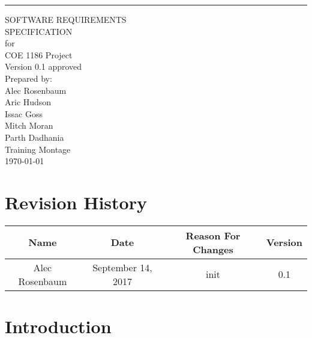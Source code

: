 \documentclass{scrreprt}
\date{}
\def\myversion{0.1 }
\begin{document}
\begin{flushright}
    \rule{16cm}{5pt}\vskip1cm
    \begin{bfseries}
        \Huge{SOFTWARE REQUIREMENTS\\ SPECIFICATION}\\
        \vspace{.9cm}
        for\\
        \vspace{.9cm}
        COE 1186 Project\\
        \vspace{.9cm}
        \LARGE{Version \myversion approved}\\
        \vspace{.9cm}
        Prepared by:\\
        Alec Rosenbaum\\
        Aric Hudson\\
        Issac Goss\\
        Mitch Moran\\
        Parth Dadhania\\
        \vspace{1.9cm}
        Training Montage\\
        \vspace{.9cm}
        \today\\
    \end{bfseries}
\end{flushright}

\tableofcontents

\chapter*{Revision History}

\begin{center}
    \begin{tabular}{|c|c|c|c|}
        \hline
	    Name & Date & Reason For Changes & Version\\
        \hline
	    Alec Rosenbaum & September 14, 2017 & init & 0.1\\
        \hline
    \end{tabular}
\end{center}

\chapter{Introduction}
\end{document}
